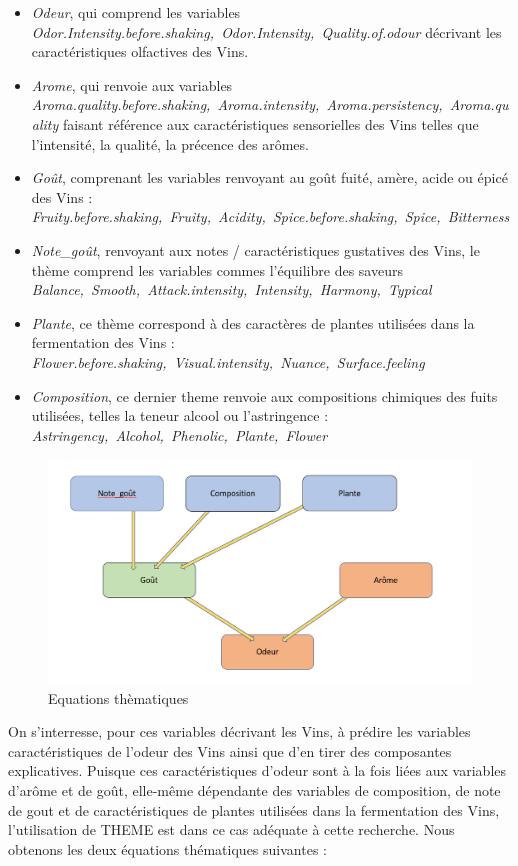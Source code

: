 \documentclass[a4paper,french,10pt]{article}
\begin{document}
\begin{itemize}
	\item \textit{Odeur}, qui comprend les variables \textit{Odor.Intensity.before.shaking,~Odor.Intensity,~Quality.of.odour} décrivant les caractéristiques olfactives des Vins. 
	\item \textit{Arome}, qui renvoie aux variables \textit{Aroma.quality.before.shaking,~Aroma.intensity,~Aroma.persistency,~Aroma.quality} faisant référence aux caractéristiques sensorielles des Vins telles que l'intensité, la qualité, la précence des arômes. 
	\item \textit{Goût}, comprenant les variables renvoyant au goût fuité, amère, acide ou épicé des Vins : \textit{Fruity.before.shaking,~Fruity,~Acidity,~Spice.before.shaking,~Spice,~Bitterness}
	\item \textit{Note\_goût}, renvoyant aux notes / caractéristiques gustatives des Vins, le thème comprend les variables commes l'équilibre des saveurs \textit{Balance,~Smooth,~Attack.intensity,~Intensity,~Harmony,~Typical}
	\item \textit{Plante}, ce thème correspond à des caractères de plantes utilisées dans la fermentation des Vins : \textit{Flower.before.shaking,~Visual.intensity,~Nuance,~Surface.feeling}
	\item \textit{Composition}, ce dernier theme renvoie aux compositions chimiques des fuits utilisées, telles la teneur alcool ou l'astringence : \textit{Astringency,~Alcohol,~Phenolic,~Plante,~Flower}
\end{itemize} 

\begin{figure}[htp] 
	\centering
	\includegraphics[scale=0.45]{images/Eq_THEME.png}
	\caption{Equations thèmatiques}
\end{figure}

On s'interresse, pour ces variables décrivant les Vins, à prédire les variables caractéristiques de l'odeur des Vins ainsi que d'en tirer des composantes explicatives. Puisque ces caractéristiques d'odeur sont à la fois liées aux variables d'arôme et de goût, elle-même dépendante des variables de composition, de note de gout et de caractéristiques de plantes utilisées dans la fermentation des Vins, l'utilisation de THEME est dans ce cas adéquate à cette recherche. Nous obtenons les deux équations thématiques suivantes : \newline
\end{document}
